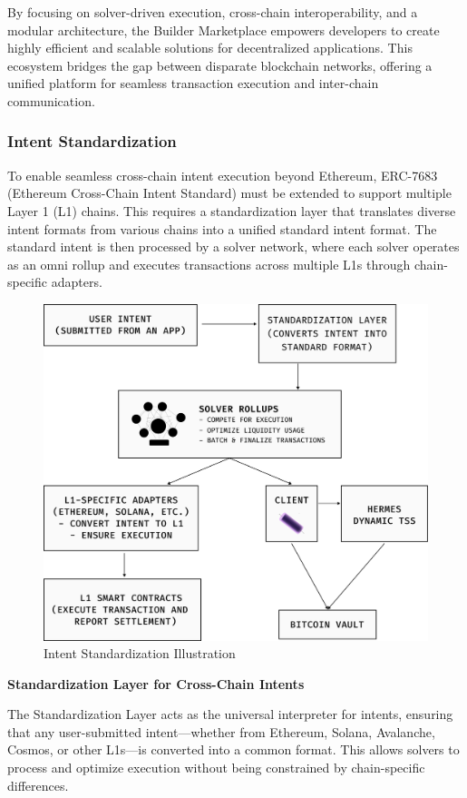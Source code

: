 By focusing on solver-driven execution, cross-chain interoperability, and a modular architecture, the Builder Marketplace empowers developers to create highly efficient and scalable solutions for decentralized applications. This ecosystem bridges the gap between disparate blockchain networks, offering a unified platform for seamless transaction execution and inter-chain communication.



\subsubsection{Intent Standardization}

To enable seamless cross-chain intent execution beyond Ethereum, ERC-7683 (Ethereum Cross-Chain Intent Standard) must be extended to support multiple Layer 1 (L1) chains. This requires a standardization layer that translates diverse intent formats from various chains into a unified standard intent format. The standard intent is then processed by a solver network, where each solver operates as an omni rollup and executes transactions across multiple L1s through chain-specific adapters.
\begin{figure}[h]
    \centering
    \includegraphics[width=0.9\linewidth]{figure/Intent.png}
    \caption{Intent Standardization Illustration}
    \label{fig:intent}
\end{figure}

\noindent
\textbf{Standardization Layer for Cross-Chain Intents}

The Standardization Layer acts as the universal interpreter for intents, ensuring that any user-submitted intent—whether from Ethereum, Solana, Avalanche, Cosmos, or other L1s—is converted into a common format. This allows solvers to process and optimize execution without being constrained by chain-specific differences.

